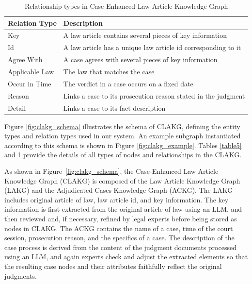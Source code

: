 \documentclass[review,times,nonatbib]{elsarticle} %
\renewcommand{\textcolor}[2]{#2}
\begin{document}
\begin{table}[h]
\caption{Relationship types in Case-Enhanced Law Article Knowledge Graph}
\label{table6}
\vspace{-5mm}
\begin{center}
\begin{tabular}{p{}|p{}}
\textbf{Relation Type}  &  \textbf{Description}  \\
\hline Key & 
A law article contains several pieces of key information
 \\ \hline
 Id & 
A law article has a unique law article id corresponding to it
 \\ \hline
 Agree With & 
A case agrees with several pieces of key information
 \\ \hline
Applicable Law & The law that matches the case
 \\ \hline
 Occur in Time & 
The verdict in a case occurs on a fixed date
 \\ \hline
 Reason & 
Links a case to its prosecution reason stated in the judgment
 \\ \hline
 Detail & 
Links a case to its fact description
 \\
\end{tabular}
\end{center}
\vspace{-8mm}
\end{table}
\textcolor{blue}{Figure \ref{fig:clakg_schema} illustrates the schema of CLAKG, defining the entity types and relation types used in our system. An example subgraph instantiated according to this schema is shown in Figure \ref{fig:clakg_example}.  Tables \ref{table5} and \ref{table6} provide the details of all types of nodes and relationships in the CLAKG.}

As shown in Figure~\ref{fig:clakg_schema}, the Case-Enhanced Law Article Knowledge Graph (CLAKG) is composed of the Law Article Knowledge Graph (LAKG) and the Adjudicated Cases Knowledge Graph (ACKG). The LAKG includes original article of law, law article id, and key information. The key information is first extracted from the original article of law using an LLM, and then reviewed and, if necessary, refined by legal experts before being stored as nodes in CLAKG. The ACKG contains the name of a case, time of the court session, prosecution reason, and the specifics of a case. The description of the case process is derived from the content of the judgment documents processed using an LLM, and again experts check and adjust the extracted elements so that the resulting case nodes and their attributes faithfully reflect the original judgments.\\
\end{document}
